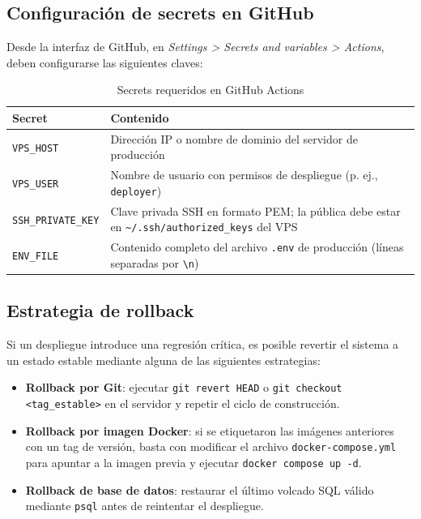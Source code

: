 \documentclass[11pt, a4paper]{article}
\begin{document}
\subsection{Configuraci\'{o}n de secrets en GitHub}

Desde la interfaz de GitHub, en \textit{Settings > Secrets and variables > Actions}, deben configurarse las siguientes claves:

\begin{table}[H]
\centering
\small
\renewcommand{\arraystretch}{1.4}
\begin{tabular}{@{}lp{8cm}@{}}
\toprule
\textbf{Secret} & \textbf{Contenido} \\
\midrule
\texttt{VPS\_HOST} & Direcci\'{o}n IP o nombre de dominio del servidor de producci\'{o}n \\
\texttt{VPS\_USER} & Nombre de usuario con permisos de despliegue (p. ej., \texttt{deployer}) \\
\texttt{SSH\_PRIVATE\_KEY} & Clave privada SSH en formato PEM; la p\'{u}blica debe estar en \texttt{\textasciitilde/.ssh/authorized\_keys} del VPS \\
\texttt{ENV\_FILE} & Contenido completo del archivo \texttt{.env} de producci\'{o}n (l\'{i}neas separadas por \texttt{\textbackslash{}n}) \\
\bottomrule
\end{tabular}
\caption{Secrets requeridos en GitHub Actions}
\label{tab:gh-secrets}
\end{table}

\subsection{Estrategia de rollback}

Si un despliegue introduce una regresi\'{o}n cr\'{i}tica, es posible revertir el sistema a un estado estable mediante alguna de las siguientes estrategias:

\begin{itemize}[leftmargin=*]
    \item \textbf{Rollback por Git}: ejecutar \texttt{git revert HEAD} o \texttt{git checkout <tag\_estable>} en el servidor y repetir el ciclo de construcci\'{o}n.
    \item \textbf{Rollback por imagen Docker}: si se etiquetaron las im\'{a}genes anteriores con un tag de versi\'{o}n, basta con modificar el archivo \texttt{docker-compose.yml} para apuntar a la imagen previa y ejecutar \texttt{docker compose up -d}.
    \item \textbf{Rollback de base de datos}: restaurar el \'{u}ltimo volcado SQL v\'{a}lido mediante \texttt{psql} antes de reintentar el despliegue.
\end{itemize}
\end{document}
